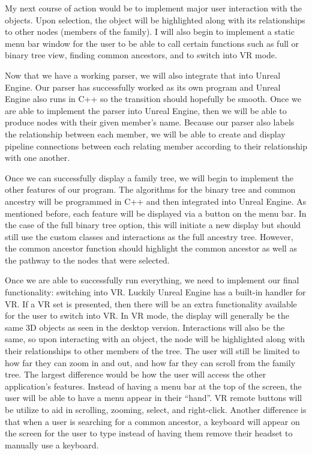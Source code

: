 \documentclass[onecolumn, draftclsnofoot, 10pt, compsoc]{IEEEtran}
\begin{document}
\begin{singlespace}
My next course of action would be to implement major user interaction with the objects. Upon selection, the object will be highlighted along with its relationships to other nodes (members of the family). I will also begin to implement a static menu bar window for the user to be able to call certain functions such as full or binary tree view, finding common ancestors, and to switch into VR mode.

Now that we have a working parser, we will also integrate that into Unreal Engine. Our parser has successfully worked as its own program and Unreal Engine also runs in C++ so the transition should hopefully be smooth. Once we are able to implement the parser into Unreal Engine, then we will be able to produce nodes with their given member's name. Because our parser also labels the relationship between each member, we will be able to create and display pipeline connections between each relating member according to their relationship with one another. 

Once we can successfully display a family tree, we will begin to implement the other features of our program. The algorithms for the binary tree and common ancestry will be programmed in C++ and then integrated into Unreal Engine. As mentioned before, each feature will be displayed via a button on the menu bar. In the case of the full binary tree option, this will initiate a new display but should still use the custom classes and interactions as the full ancestry tree. However, the common ancestor function should highlight the common ancestor as well as the pathway to the nodes that were selected. 

Once we are able to successfully run everything, we need to implement our final functionality: switching into VR. Luckily Unreal Engine has a built-in handler for VR. If a VR set is presented, then there will be an extra functionality available for the user to switch into VR. In VR mode, the display will generally be the same 3D objects as seen in the desktop version. Interactions will also be the same, so upon interacting with an object, the node will be highlighted along with their relationships to other members of the tree. The user will still be limited to how far they can zoom in and out, and how far they can scroll from the family tree. The largest difference would be how the user will access the other application's features. Instead of having a menu bar at the top of the screen, the user will be able to have a menu appear in their “hand”. VR remote buttons will be utilize to aid in scrolling, zooming, select, and right-click. Another difference is that when a user is searching for a common ancestor, a keyboard will appear on the screen for the user to type instead of having them remove their headset to manually use a keyboard.


\end{singlespace}
\end{document}
